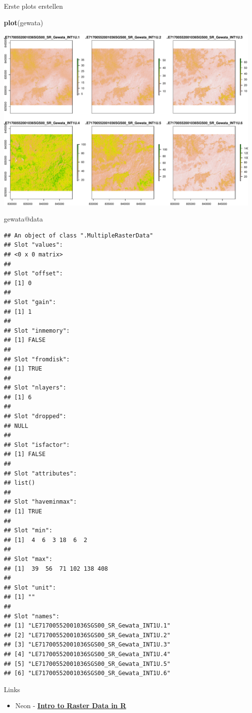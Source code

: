 \documentclass[ignorenonframetext,]{beamer}
\newenvironment{Shaded}{\begin{snugshade}}{\end{snugshade}}
\newcommand{\KeywordTok}[1]{\textcolor[rgb]{0.26,0.66,0.93}{\textbf{#1}}}
\newcommand{\NormalTok}[1]{\textcolor[rgb]{0.74,0.68,0.62}{#1}}
\newcommand{\OperatorTok}[1]{\textcolor[rgb]{0.74,0.68,0.62}{#1}}
\providecommand{\tightlist}{%
  \setlength{\itemsep}{0pt}\setlength{\parskip}{0pt}}
\begin{document}
\begin{frame}[fragile]{Erste plots erstellen}
\protect\hypertarget{erste-plots-erstellen}{}

\begin{Shaded}
\begin{Highlighting}[]
\KeywordTok{plot}\NormalTok{(gewata)}
\end{Highlighting}
\end{Shaded}

\includegraphics{A8_Rasterdaten_files/figure-beamer/unnamed-chunk-14-1.pdf}

\begin{Shaded}
\begin{Highlighting}[]
\NormalTok{gewata}\OperatorTok{@}\NormalTok{data}
\end{Highlighting}
\end{Shaded}

\begin{verbatim}
## An object of class ".MultipleRasterData"
## Slot "values":
## <0 x 0 matrix>
## 
## Slot "offset":
## [1] 0
## 
## Slot "gain":
## [1] 1
## 
## Slot "inmemory":
## [1] FALSE
## 
## Slot "fromdisk":
## [1] TRUE
## 
## Slot "nlayers":
## [1] 6
## 
## Slot "dropped":
## NULL
## 
## Slot "isfactor":
## [1] FALSE
## 
## Slot "attributes":
## list()
## 
## Slot "haveminmax":
## [1] TRUE
## 
## Slot "min":
## [1]  4  6  3 18  6  2
## 
## Slot "max":
## [1]  39  56  71 102 138 408
## 
## Slot "unit":
## [1] ""
## 
## Slot "names":
## [1] "LE71700552001036SGS00_SR_Gewata_INT1U.1"
## [2] "LE71700552001036SGS00_SR_Gewata_INT1U.2"
## [3] "LE71700552001036SGS00_SR_Gewata_INT1U.3"
## [4] "LE71700552001036SGS00_SR_Gewata_INT1U.4"
## [5] "LE71700552001036SGS00_SR_Gewata_INT1U.5"
## [6] "LE71700552001036SGS00_SR_Gewata_INT1U.6"
\end{verbatim}

\end{frame}

\begin{frame}{Links}
\protect\hypertarget{links}{}

\begin{itemize}
\tightlist
\item
  Neon -
  \href{https://www.neonscience.org/dc-raster-data-r}{\textbf{Intro to
  Raster Data in R}}
\end{itemize}

\end{frame}
\end{document}
